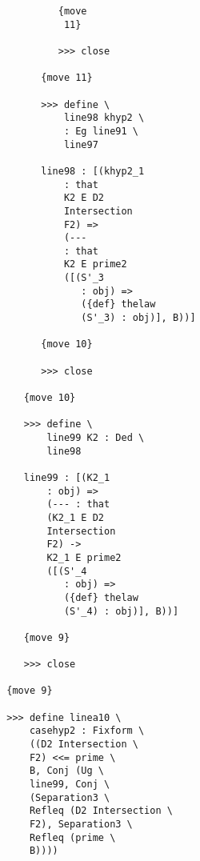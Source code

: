 \documentclass[12pt]{article}
\begin{document}
\begin{verbatim}
                                    {move 
                                     11}

                                    >>> close

                                 {move 11}

                                 >>> define \
                                     line98 khyp2 \
                                     : Eg line91 \
                                     line97

                                 line98 : [(khyp2_1 
                                     : that 
                                     K2 E D2 
                                     Intersection 
                                     F2) => 
                                     (--- 
                                     : that 
                                     K2 E prime2 
                                     ([(S'_3 
                                        : obj) => 
                                        ({def} thelaw 
                                        (S'_3) : obj)], B))]

                                 {move 10}

                                 >>> close

                              {move 10}

                              >>> define \
                                  line99 K2 : Ded \
                                  line98

                              line99 : [(K2_1 
                                  : obj) => 
                                  (--- : that 
                                  (K2_1 E D2 
                                  Intersection 
                                  F2) -> 
                                  K2_1 E prime2 
                                  ([(S'_4 
                                     : obj) => 
                                     ({def} thelaw 
                                     (S'_4) : obj)], B))]

                              {move 9}

                              >>> close

                           {move 9}

                           >>> define linea10 \
                               casehyp2 : Fixform \
                               ((D2 Intersection \
                               F2) <<= prime \
                               B, Conj (Ug \
                               line99, Conj \
                               (Separation3 \
                               Refleq (D2 Intersection \
                               F2), Separation3 \
                               Refleq (prime \
                               B))))


\end{verbatim}
\end{document}

